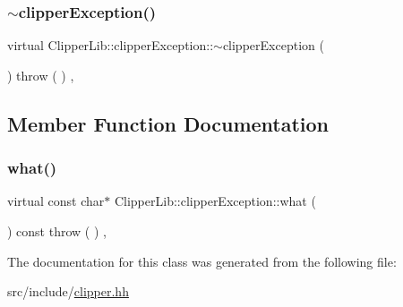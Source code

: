 \mbox{\label{class_clipper_lib_1_1clipper_exception_ae64ee27d7b74c6f4f62aaf466bfc9c19}} 
\subsubsection{\texorpdfstring{$\sim$clipperException()}{~clipperException()}}
{\footnotesize\ttfamily virtual Clipper\+Lib\+::clipper\+Exception\+::$\sim$clipper\+Exception (\begin{DoxyParamCaption}{ }\end{DoxyParamCaption}) throw ( ) \hspace{0.3cm}{\ttfamily [inline]}, {\ttfamily [virtual]}}



\subsection{Member Function Documentation}
\mbox{\label{class_clipper_lib_1_1clipper_exception_a32b7ac5a3176d9040ef0a863fd54657a}} 
\subsubsection{\texorpdfstring{what()}{what()}}
{\footnotesize\ttfamily virtual const char$\ast$ Clipper\+Lib\+::clipper\+Exception\+::what (\begin{DoxyParamCaption}{ }\end{DoxyParamCaption}) const throw ( ) \hspace{0.3cm}{\ttfamily [inline]}, {\ttfamily [virtual]}}



The documentation for this class was generated from the following file\+:\begin{DoxyCompactItemize}
\item 
src/include/\mbox{\hyperlink{clipper_8hh}{clipper.\+hh}}\end{DoxyCompactItemize}
